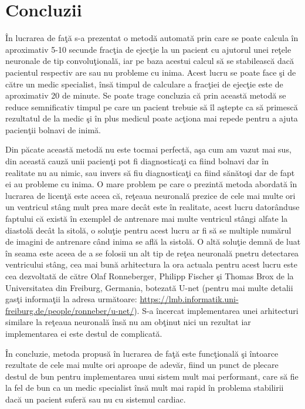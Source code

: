 \chapter{Concluzii}

\^{I}n lucrarea de fa\c{t}\u{a} s-a prezentat o metod\u{a} automat\u{a} prin care se poate calcula \^{i}n aproximativ 5-10 secunde frac\c{t}ia de ejec\c{t}ie la un pacient cu ajutorul unei re\c{t}ele neuronale de tip convolu\c{t}ional\u{a}, iar pe baza acestui calcul s\u{a} se stabileasc\u{a} dac\u{a} pacientul respectiv are sau nu probleme cu inima. Acest lucru se poate face \c{s}i de c\u{a}tre un medic specialist, \^{i}ns\u{a} timpul de calculare a frac\c{t}iei de ejec\c{t}ie este de aproximativ 20 de minute. Se poate trage concluzia c\u{a} prin aceast\u{a} metod\u{a} se reduce semnificativ timpul pe care un pacient trebuie s\u{a} \^{i}l a\c{s}tepte ca s\u{a} primesc\u{a} rezultatul de la medic \c{s}i \^{i}n plus medicul poate ac\c{t}iona mai repede pentru a ajuta pacien\c{t}ii bolnavi de inim\u{a}.

\par

Din p\u{a}cate aceast\u{a} metod\u{a} nu este tocmai perfect\u{a}, a\c{s}a cum am vazut mai sus, din aceast\u{a} cauz\u{a} unii pacien\c{t}i pot fi diagnostica\c{t}i ca fiind bolnavi dar \^{i}n realitate nu au nimic, sau invers s\u{a} fiu diagnostica\c{t}i ca fiind s\u{a}n\u{a}to\c{s}i dar de fapt ei au probleme cu inima. O mare problem pe care o prezint\u{a} metoda abordat\u{a} \^{i}n lucrarea de licen\c{t}\u{a} este aceea c\u{a}, re\c{t}eaua neuronal\u{a} prezice de cele mai multe ori un ventricul st\^{a}ng mult prea mare dec\^{a}t este \^{i}n realitate, acest lucru dator\^{a}nduse faptului c\u{a} exist\u{a} \^{i}n exemplel de antrenare mai multe ventricul st\^{a}ngi alfate la diastol\u{a} dec\^{a}t la sitol\u{a}, o solu\c{t}ie pentru acest lucru ar fi s\u{a} se multiple num\u{a}rul de imagini de antrenare c\^{a}nd inima se afl\u{a} la sistol\u{a}. O alt\u{a} solu\c{t}ie demn\u{a} de luat \^{i}n seama este aceea de a se folosii un alt tip de re\c{t}ea neuronal\u{a} pnetru detectarea ventricului st\^{a}ng, cea mai bun\u{a} arhitectura la ora actuala pentru acest lucru este cea dezvoltat\u{a} de c\u{a}tre Olaf Ronneberger, Philipp Fischer \c{s}i Thomas Brox de la Universitatea din Freiburg, Germania, botezat\u{a} U-net (pentru mai multe detalii gas\c{t}i informa\c{t}ii la adresa urm\u{a}toare: \url{https://lmb.informatik.uni-freiburg.de/people/ronneber/u-net/}). S-a \^{i}ncercat implementarea unei arhitecturi similare la re\c{t}eaua neuronal\u{a} \^{i}ns\u{a} nu am ob\c{t}inut nici un rezultat iar implementarea ei este destul de complicat\u{a}.

\par

\^{I}n concluzie, metoda propus\u{a} \^{i}n lucrarea de fa\c{t}\u{a} este func\c{t}ional\u{a} \c{s}i \^{i}ntoarce rezultate de cele mai multe ori aproape de adev\u{a}r, fiind un punct de plecare destul de bun pentru implementarea unui sistem mult mai performant, care s\u{a} fie la fel de bun ca un medic specialist \^{i}ns\u{a} mult mai rapid \^{i}n problema stabilirii dac\u{a} un pacient sufer\u{a} sau nu cu sistemul cardiac. 